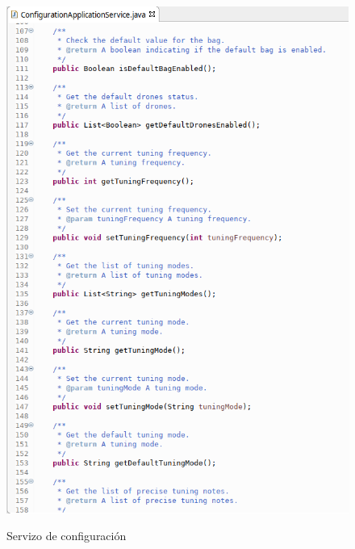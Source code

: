    \begin{figure}[htbp]
    \centering
    \includegraphics[scale=0.6, keepaspectratio=true]{./imagenes/servizo-configuracion-3.png} \\
    \caption{Servizo de configuración}
    \label{figura:ServizoConfiguracion3}
   \end{figure}
   
